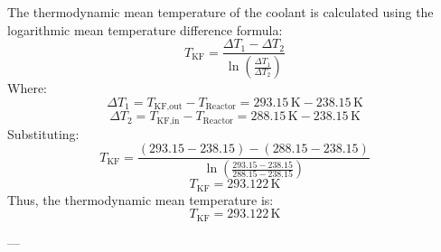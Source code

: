 The thermodynamic mean temperature of the coolant is calculated using the logarithmic mean temperature difference formula:  
\[
T_{\text{KF}} = \frac{\Delta T_1 - \Delta T_2}{\ln \left( \frac{\Delta T_1}{\Delta T_2} \right)}
\]  
Where:  
\[
\Delta T_1 = T_{\text{KF,out}} - T_{\text{Reactor}} = 293.15 \, \text{K} - 238.15 \, \text{K}
\]  
\[
\Delta T_2 = T_{\text{KF,in}} - T_{\text{Reactor}} = 288.15 \, \text{K} - 238.15 \, \text{K}
\]  
Substituting:  
\[
T_{\text{KF}} = \frac{(293.15 - 238.15) - (288.15 - 238.15)}{\ln \left( \frac{293.15 - 238.15}{288.15 - 238.15} \right)}
\]  
\[
T_{\text{KF}} = 293.122 \, \text{K}
\]  
Thus, the thermodynamic mean temperature is:  
\[
T_{\text{KF}} = 293.122 \, \text{K}
\]  

---